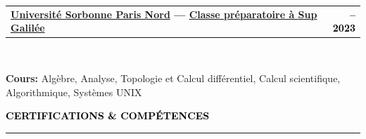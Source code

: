 \documentclass[10pt,english,french]{article}
\makeatletter
\newcommand{\certificateIcon}[1][black]{\textcolor{#1}{\faClipboard}}
\newlength{\mpwidth}
\newcommand{\cvsection}[1]{
    \vspace{4pt}
    \textbf{\fontsize{9pt}{10pt}\selectfont \textcolor{black}{#1}}
    \vspace{6pt}
    \hrule
    \vspace{6pt}
}
\newcommand{\cvtextnotab}[1]{
    \parbox{1\mpwidth}{#1}
}
\newcommand{\cvevent}[2]{
    \vspace{2pt}
    \parbox{\mpwidth}{
        \begin{tabular*}{1\mpwidth}{@{\extracolsep{\fill}} l r}
            \textcolor{black}{\textbf{\fontsize{11}{12}\selectfont #1}} & \textcolor{black}{\textbf{\fontsize{12}{12}\selectfont #2}} \\
        \end{tabular*}\\[-8pt] %
    }
}
\newcommand{\cvsubevent}[2]{
    \parbox{\mpwidth}{
        \begin{tabular*}{1\mpwidth}{@{\extracolsep{\fill}} l r}
            \textcolor{black}{\textit{\fontsize{10}{12}\selectfont #1}} & \textcolor{black}{\textit{\fontsize{10}{12}\selectfont #2}} \\
        \end{tabular*}\\[-8pt] %
    }
    \vspace{-10pt}
}
\makeatother
\begin{document}
\cvevent{\href{https://www.univ-spn.fr}{Université Sorbonne Paris Nord} --- \href{https://www.sup-galilee.univ-paris13.fr/index.php/formation/cp2i/}{Classe préparatoire à \textbf{Sup Galilée}}}{\fontsize{11pt}{11pt}\selectfont 2021\hspace{5pt}--\hspace{5pt}2023}

\vspace{-10pt}
\cvtextnotab{\textbf{Cours\!:} Algèbre, Analyse, Topologie et Calcul différentiel, Calcul scientifique, Algorithmique, Systèmes UNIX}



\vspace{-14pt}
\cvsection{\certificateIcon[black]\hspace{4pt}CERTIFICATIONS \& COMPÉTENCES}
\end{document}
